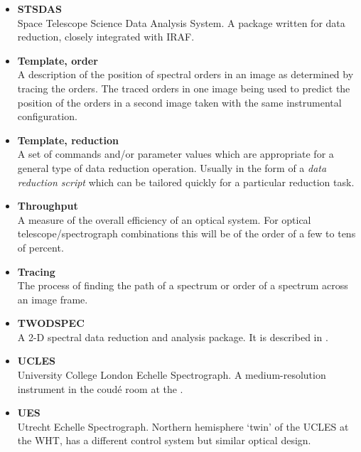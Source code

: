 \documentclass[twoside,11pt]{starlink}
\begin{document}
\begin{itemize}
\item {\bf\label{gl_stsdas}STSDAS}\\
      Space Telescope Science Data Analysis System.  A package written
      for  data reduction, closely integrated with IRAF.

\item {\bf\label{gl_template_order}Template, order}\\
      A description of the position of spectral orders in an image
      as determined by tracing the orders.  The traced orders in one image
      being used to predict the position of the orders in a second image
      taken with the same instrumental configuration.

\item {\bf\label{gl_template_reduct}Template, reduction}\\
      A set of commands and/or parameter values which are appropriate for a
      general type of data reduction operation.  Usually in the form of a
      {\sl data reduction script} which can be tailored quickly for a
      particular reduction task.

\item {\bf\label{gl_throughput}Throughput}\\
      A measure of the overall efficiency of an optical system.
      For optical telescope/spectrograph combinations this will be of
      the order of a few to tens of percent.

\item {\bf\label{gl_tracing}Tracing}\\
      The process of finding the path of a spectrum or order of a spectrum
      across an image frame.

\item {\bf\label{gl_twodspec}TWODSPEC}\\
      A 2-D spectral data reduction and analysis package. It is described in
      .

\item {\bf\label{gl_ucles}UCLES}\\
      University College London Echelle Spectrograph.
      A medium-resolution instrument in the coud\'{e} room at the
      .

\item {\bf\label{gl_ues}UES}\\
      Utrecht Echelle Spectrograph.
      Northern hemisphere `twin' of the UCLES at the WHT, has a
      different control system but similar optical design.


\end{itemize}
\end{document}
